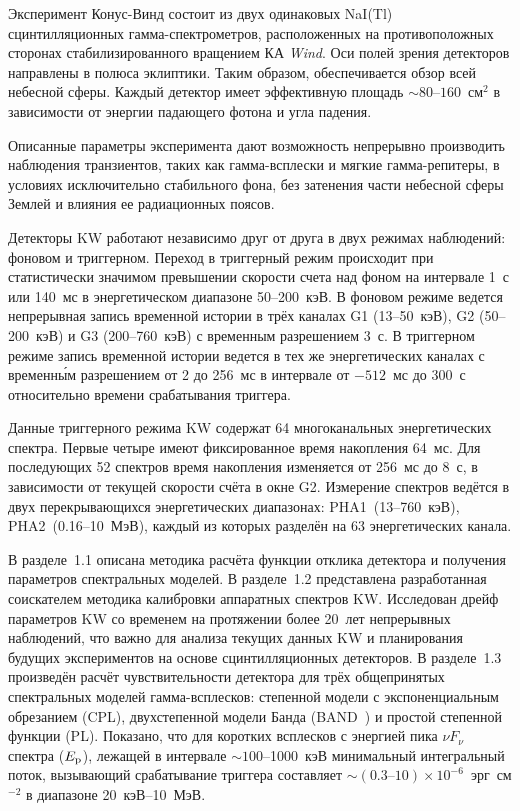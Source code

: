 Эксперимент Конус-Винд состоит из двух одинаковых NaI(Tl) сцинтилляционных 
гамма-спектрометров, расположенных на противоположных сторонах стабилизированного 
вращением КА \textit{Wind}. Оси полей зрения детекторов 
направлены в полюса эклиптики. Таким образом, обеспечивается обзор всей небесной сферы. 
Каждый детектор имеет эффективную площадь $\sim 80\textrm{--}160$~см$^2$ в 
зависимости от энергии падающего фотона и угла падения.  

Описанные параметры эксперимента дают 
возможность непрерывно производить наблюдения транзиентов, таких как гамма-всплески 
и мягкие гамма-репитеры, в условиях исключительно стабильного фона, 
без затенения части небесной сферы Землей и влияния ее радиационных поясов. 

Детекторы KW работают независимо друг от друга в двух режимах наблюдений: 
фоновом и триггерном. Переход в триггерный режим происходит при статистически 
значимом превышении скорости счета над фоном на интервале 1~с или 140~мс 
в энергетическом диапазоне 50--200~кэВ. В фоновом режиме ведется 
непрерывная запись временной истории в трёх каналах G1 (13--50~кэВ), G2 (50--200~кэВ) 
и G3 (200--760~кэВ) с временным разрешением $3$~с. В триггерном режиме запись 
временной истории ведется в тех же энергетических каналах с временн\'{ы}м разрешением 
от 2 до 256~мс в интервале от $-512$~мс до $300$~с относительно времени срабатывания 
триггера.

Данные триггерного режима KW содержат 64 многоканальных энергетических спектра. 
Первые четыре имеют фиксированное время накопления 64~мс.
Для последующих 52 спектров время накопления изменяется от 256~мс до $8$~с, 
в зависимости от текущей скорости счёта в окне G2.
Измерение спектров ведётся в двух перекрывающихся энергетических диапазонах:  
PHA1~(13--760~кэВ), PHA2~(0.16--10~МэВ), каждый из которых 
разделён на 63 энергетических канала.

В разделе~1.1 описана методика расчёта функции отклика детектора и 
получения параметров спектральных моделей. В разделе~1.2 представлена 
разработанная соискателем методика калибровки аппаратных спектров KW. 
Исследован дрейф параметров KW со временем на протяжении 
более 20~лет непрерывных наблюдений, что важно для анализа текущих данных KW и 
планирования будущих экспериментов на основе сцинтилляционных детекторов.
В разделе~1.3 произведён расчёт чувствительности детектора для трёх общепринятых 
спектральных моделей гамма-всплесков: степенной модели с экспоненциальным обрезанием (CPL),
двухстепенной модели Банда (BAND~\citep{Band_1993ApJ}) и простой степенной функции (PL).
Показано, что для коротких всплесков с энергией пика $\nu F_{\nu}$ 
спектра ($E_{\mathrm{p}}$), лежащей в интервале
$\sim 100$--1000~кэВ минимальный интегральный поток, вызывающий срабатывание триггера
составляет $\sim (0.3\textrm{--}10) \times 10^{-6}$~эрг~см$^{-2}$ в диапазоне 20~кэВ--10~МэВ.

